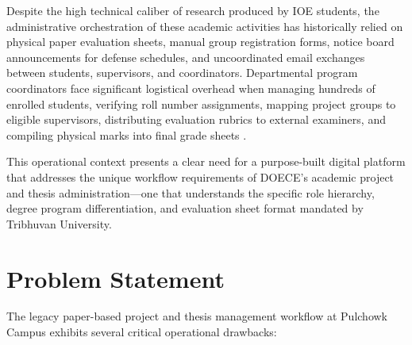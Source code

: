\documentclass[12pt]{report}
\begin{document}
Despite the high technical caliber of research produced by IOE students, the administrative orchestration of these academic activities has historically relied on physical paper evaluation sheets, manual group registration forms, notice board announcements for defense schedules, and uncoordinated email exchanges between students, supervisors, and coordinators. Departmental program coordinators face significant logistical overhead when managing hundreds of enrolled students, verifying roll number assignments, mapping project groups to eligible supervisors, distributing evaluation rubrics to external examiners, and compiling physical marks into final grade sheets \citep{pressman2014software}.

This operational context presents a clear need for a purpose-built digital platform that addresses the unique workflow requirements of DOECE's academic project and thesis administration---one that understands the specific role hierarchy, degree program differentiation, and evaluation sheet format mandated by Tribhuvan University.

\section{Problem Statement}

The legacy paper-based project and thesis management workflow at Pulchowk Campus exhibits several critical operational drawbacks:
\end{document}
